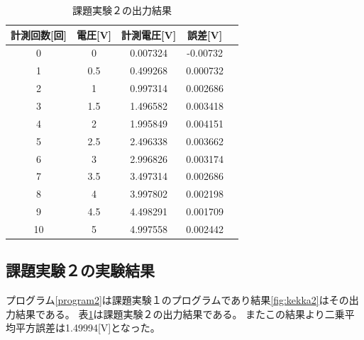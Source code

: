 \documentclass[11pt,dvipdfmx]{jarticle}
\begin{document}
				\begin{table}[H]
					\centering
					\caption{課題実験２の出力結果}
					\label{tab:task2}
					\begin{tabular}{|c|c|c|c|c|}
					\hline
					計測回数[回]&電圧[V]&計測電圧[V]&誤差[V]\\
					\hline
					0  & 0   & 0.007324 & -0.00732 \\
					1  & 0.5 & 0.499268 & 0.000732 \\
					2  & 1   & 0.997314 & 0.002686 \\
					3  & 1.5 & 1.496582 & 0.003418 \\
					4  & 2   & 1.995849 & 0.004151 \\
					5  & 2.5 & 2.496338 & 0.003662 \\
					6  & 3   & 2.996826 & 0.003174 \\
					7  & 3.5 & 3.497314 & 0.002686 \\
					8  & 4   & 3.997802 & 0.002198 \\
					9  & 4.5 & 4.498291 & 0.001709 \\
					10 & 5   & 4.997558 & 0.002442\\
					\hline
					\end{tabular}
					\end{table}

	\subsection{課題実験２の実験結果}
		プログラム\ref{program2}は課題実験１のプログラムであり結果\ref{fig:kekka2}はその出力結果である。
		表\ref{tab:task2}は課題実験２の出力結果である。
		またこの結果より二乗平均平方誤差は1.49994[V]となった。
		\newpage
\end{document}
